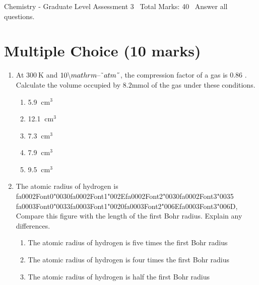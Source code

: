 \documentclass[12pt]{article}
\begin{document}
\begin{center}
Chemistry - Graduate Level Assessment 3 \
Total Marks: 40 \
Answer all questions.
\end{center}

\section*{Multiple Choice (10 marks)}
\begin{enumerate}[label=\arabic*.]
\item At $300 \mathrm{~K}$ and ${\csname fa0000Font0\endcsname\char"0031}{\char"0030}{\csname fa0000Font2\endcsname\char"0020}{\csname fa0000Font3\endcsname\char"005C}{\csname fa0000Font4\endcsname\char"006D}{\csname fa0000Font5\endcsname\char"0061}{\csname fa0000Font6\endcsname\char"0074}{\csname fa0000Font7\endcsname\char"0068} {\csname fa0001Font0\endcsname\char"0072}{\csname fa0001Font1\endcsname\char"006D}{\csname fa0001Font2\endcsname\char"007B}{\csname fa0001Font3\endcsname\char"007E}{\csname fa0001Font4\endcsname\char"0061}{\char"0074}{\char"006D}{\char"007D}$, the compression factor of a gas is 0.86 .
Calculate the volume occupied by $8.2 \mathrm{mmol}$ of the gas under these conditions.
\begin{enumerate}[label=(\alph*)]
    \item 5.9 $\mathrm{~cm}^3$
    \item 12.1 $\mathrm{~cm}^3$
    \item 7.3 $\mathrm{~cm}^3$
    \item 7.9 $\mathrm{~cm}^3$
    \item 9.5 $\mathrm{~cm}^3$
\end{enumerate}
\item The atomic radius of hydrogen is {\csname fa0002Font0\endcsname\char"0030}{\csname fa0002Font1\endcsname\char"002E}{\csname fa0002Font2\endcsname\char"0030}{\csname fa0002Font3\endcsname\char"0035} {\csname fa0003Font0\endcsname\char"0033}{\csname fa0003Font1\endcsname\char"0020}{\csname fa0003Font2\endcsname\char"006E}{\csname fa0003Font3\endcsname\char"006D}, Compare this figure with the length of the
first Bohr radius. Explain any differences.
\begin{enumerate}[label=(\alph*)]
    \item The atomic radius of hydrogen is five times the first Bohr radius
    \item The atomic radius of hydrogen is four times the first Bohr radius
    \item The atomic radius of hydrogen is half the first Bohr radius

\end{enumerate}
\end{enumerate}
\end{document}
